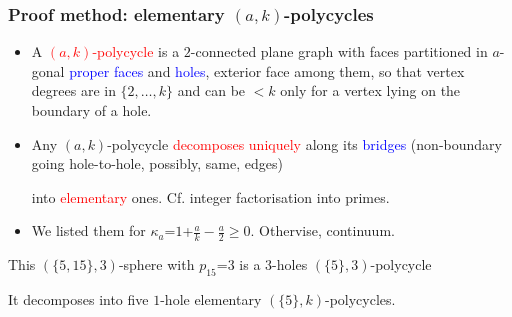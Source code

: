 \documentclass{beamer}
\begin{document}
\begin{frame}\frametitle{Proof method: elementary $(a,k)$-polycycles}
\vspace{-3.5mm}
\begin{itemize}
\item A \textcolor{red}{$(a,k)$-polycycle} is a
$2$-connected plane graph with faces partitioned
in  $a$-gonal
\textcolor{blue}{proper  faces} and 
\textcolor{blue}{holes}, exterior face among them, 
so that
vertex degrees are  in $\{2,\dots ,k\}$ and  can be  $<k$
only for a  vertex lying on the
boundary of a hole.
\item Any $(a,k)$-polycycle \textcolor{red}{decomposes uniquely} along 
its \textcolor{blue}{bridges} (non-boundary  going   
hole-to-hole, possibly, same, edges)

into  \textcolor{red}{elementary} ones. Cf. integer factorisation into 
primes.  
\item We listed them for $\kappa_a$=$1$+$\frac{a}{k}-\frac{a}{2}$$\ge$$0$. Othervise, 
continuum.
\end{itemize}

\begin{center}
\begin{minipage}[b]{20mm}
\centering
{}\par
\end{minipage}
\end{center} 
This $(\{5,15\},3)$-sphere with $p_{15}$=$3$ 
is a $3$-holes $(\{5\},3)$-polycycle 

It decomposes into five
$1$-hole elementary $(\{5\},k)$-polycycles.

\end{frame} 

\end{document}
